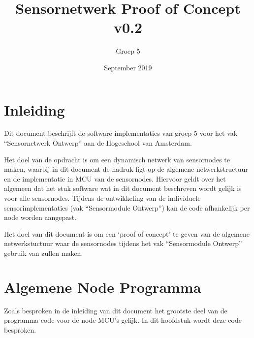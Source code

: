 \documentclass[a4paper, 11pt]{article}
\title{Sensornetwerk Proof of Concept v0.2}
\author{Groep 5}
\date{September 2019}
\begin{document}
\maketitle
\clearpage
{}
\clearpage

\section{Inleiding}
Dit document beschrijft de software implementaties van groep 5 voor het vak ``Sensornetwerk Ontwerp'' aan de Hogeschool van Amsterdam.

Het doel van de opdracht is om een dynamisch netwerk van sensornodes te maken, waarbij in dit document de nadruk ligt op de algemene netwerkstructuur en de implementatie in MCU van de sensornodes. Hiervoor geldt over het algemeen dat het stuk software wat in dit document beschreven wordt gelijk is voor alle sensornodes. Tijdens de ontwikkeling van de individuele sensorimplementaties (vak ``Sensormodule Ontwerp'') kan de code afhankelijk per node worden aangepast. 

Het doel van dit document is om een `proof of concept' te geven van de algemene netwerkstuctuur waar de sensornodes tijdens het vak ``Sensormodule Ontwerp'' gebruik van zullen maken.

\section{Algemene Node Programma}
Zoals besproken in de inleiding van dit document het grootste deel van de programma code voor de node MCU's gelijk. In dit hoofdstuk wordt deze code besproken.
\end{document}
